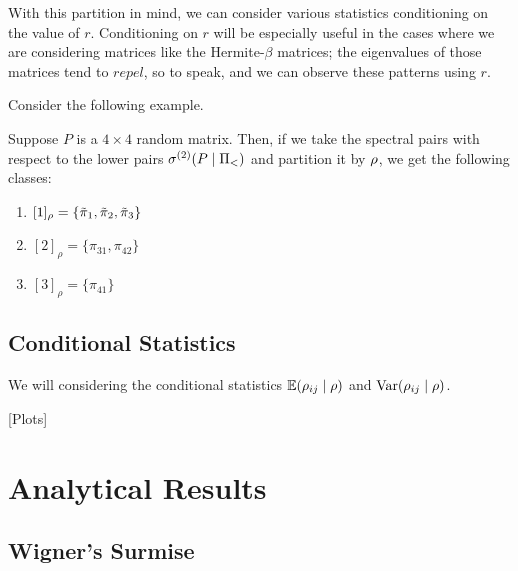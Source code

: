 
\newpage

With this partition in mind, we can consider various statistics conditioning on the value of $r$.
Conditioning on $r$ will be especially useful in the cases where we are considering matrices like the Hermite-$\beta$ matrices;
the eigenvalues of those matrices tend to $\textit{repel}$, so to speak, and we can observe these patterns using $r$. \newline

\noindent Consider the following example.

\begin{example}
Suppose $P$ is a $4 \times 4$ random matrix. Then, if we take the spectral pairs with respect to the lower pairs ${\sigma^{(2)}}(P \mid \Pi_<)$ and partition it by ${\rho}$,
we get the following classes:
\begin{enumerate}
  \item $[1]_\rho = \{{\tilde{\pi}}_1, {\tilde{\pi}}_2, {\tilde{\pi}}_3\}$
  \item $[2]_\rho = \{\pi_{31}, \pi_{42}\}$
  \item $[3]_\rho = \{\pi_{41}\}$
\end{enumerate}
\end{example}

\subsection{Conditional Statistics}

We will considering the conditional statistics $\mathbb{E}({\rho}_{ij} \mid \rho)$ and $\text{Var}({\rho}_{ij} \mid \rho)$.

[Plots]

\newpage
\section{Analytical Results}


\subsection{Wigner's Surmise}

